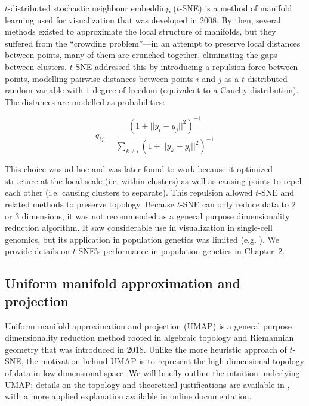 $t$-distributed stochastic neighbour embedding ($t$-SNE) is a method of manifold learning used for visualization that was developed in 2008\citep{maaten_visualizing_2008}. By then, several methods existed to approximate the local structure of manifolds, but they suffered from the ``crowding problem''---in an attempt to preserve local distances between points, many of them are crunched together, eliminating the gaps between clusters. $t$-SNE addressed this by introducing a repulsion force between points, modelling pairwise distances between points $i$ and $j$ as a $t$-distributed random variable with $1$ degree of freedom (equivalent to a Cauchy distribution). The distances are modelled as probabilities:

$$q_{ij} = \frac{(1 + ||y_{i} - y_{j}||^{2})^{-1}}{\sum_{k \neq l}(1 + ||y_{k} - y_{l}||^{2})^{-1}}$$

This choice was ad-hoc and was later found to work because it optimized structure at the local scale (i.e. within clusters) as well as causing points to repel each other (i.e. causing clusters to separate)\citep{carreira-perpinan_elastic_2010}. This repulsion allowed $t$-SNE and related methods to preserve topology\citep{wasserman_topological_2018}. Because $t$-SNE can only reduce data to $2$ or $3$ dimensions, it was not recommended as a general purpose dimensionality reduction algorithm\citep{maaten_visualizing_2008}. It saw considerable use in visualization in single-cell genomics\citep{kobak_art_2019}, but its application in population genetics was limited (e.g. \citep{li_application_2017}). We provide details on $t$-SNE's performance in population genetics in \hyperref[chap:chapter2]{Chapter~2}.

\subsection{Uniform manifold approximation and projection}

Uniform manifold approximation and projection (UMAP) is a general purpose dimensionality reduction method rooted in algebraic topology and Riemannian geometry that was introduced in 2018\citep{mcinnes_umap_2020}. Unlike the more heuristic approach of $t$-SNE, the motivation behind UMAP is to represent the high-dimensional topology of data in low dimensional space. We will briefly outline the intuition underlying UMAP; details on the topology and theoretical justifications are available in \citep{mcinnes_umap_2020}, with a more applied explanation available in online documentation\citep{mcinnes_umapdoc_2018}.

